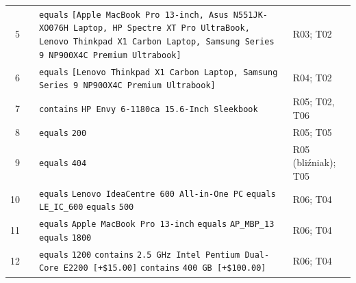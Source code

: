 {\begin{xltabular}{\linewidth}{@{}r >{\raggedright\arraybackslash}p{3.0cm} >{\raggedright\arraybackslash}X >{\raggedright\arraybackslash}p{2.4cm}@{}}
5 &  &  \texttt{equals} \texttt{[\textquotedbl{}Apple MacBook Pro 13-inch\textquotedbl{}, \textquotedbl{}Asus N551JK-XO076H Laptop\textquotedbl{}, \textquotedbl{}HP Spectre XT Pro UltraBook\textquotedbl{}, \textquotedbl{}Lenovo Thinkpad X1 Carbon Laptop\textquotedbl{}, \textquotedbl{}Samsung Series 9 NP900X4C Premium Ultrabook\textquotedbl{}]} & R03; T02 \\
6 &  &  \texttt{equals} \texttt{[\textquotedbl{}Lenovo Thinkpad X1 Carbon Laptop\textquotedbl{}, \textquotedbl{}Samsung Series 9 NP900X4C Premium Ultrabook\textquotedbl{}]} & R04; T02 \\
7 &  &  \texttt{contains} \texttt{\textquotedbl{}HP Envy 6-1180ca 15.6-Inch Sleekbook\textquotedbl{}} & R05; T02, T06 \\
8 &  &  \texttt{equals} \texttt{200} & R05; T05 \\
9 &  &  \texttt{equals} \texttt{404} & R05 (bliźniak); T05 \\
10 &  &  \texttt{equals} \texttt{\textquotedbl{}Lenovo IdeaCentre 600 All-in-One PC\textquotedbl{}} \newline {} \texttt{equals} \texttt{\textquotedbl{}LE\_IC\_600\textquotedbl{}} \newline {} \texttt{equals} \texttt{500} & R06; T04 \\
11 &  &  \texttt{equals} \texttt{\textquotedbl{}Apple MacBook Pro 13-inch\textquotedbl{}} \newline {} \texttt{equals} \texttt{\textquotedbl{}AP\_MBP\_13\textquotedbl{}} \newline {} \texttt{equals} \texttt{1800} & R06; T04 \\
12 &  &  \texttt{equals} \texttt{1200} \newline {} \texttt{contains} \texttt{\textquotedbl{}2.5 GHz Intel Pentium Dual-Core E2200 [+\$15.00]\textquotedbl{}} \newline {} \texttt{contains} \texttt{\textquotedbl{}400 GB [+\$100.00]\textquotedbl{}} & R06; T04 \\

\end{xltabular}}
